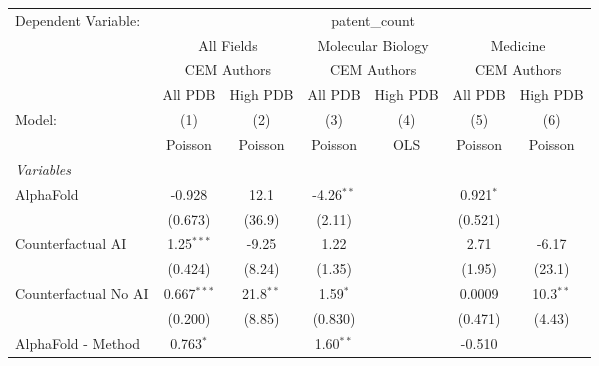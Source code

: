\begingroup
\centering
\begin{tabular}{lcccccc}
   \tabularnewline \midrule \midrule
   Dependent Variable: & \multicolumn{6}{c}{patent\_count}\\
 & \multicolumn{2}{c}{All Fields} & \multicolumn{2}{c}{Molecular Biology} & \multicolumn{2}{c}{Medicine} \\
\cmidrule(lr){2-3} \cmidrule(lr){4-5} \cmidrule(lr){6-7}
 & \multicolumn{2}{c}{CEM Authors} & \multicolumn{2}{c}{CEM Authors} & \multicolumn{2}{c}{CEM Authors} \\
\cmidrule(lr){2-3} \cmidrule(lr){4-5} \cmidrule(lr){6-7}
 & \multicolumn{1}{c}{All PDB} & \multicolumn{1}{c}{High PDB} & \multicolumn{1}{c}{All PDB} & \multicolumn{1}{c}{High PDB} & \multicolumn{1}{c}{All PDB} & \multicolumn{1}{c}{High PDB} \\
\cmidrule(lr){2-2} \cmidrule(lr){3-3} \cmidrule(lr){4-4} \cmidrule(lr){5-5} \cmidrule(lr){6-6} \cmidrule(lr){7-7}
   Model:                                                     & (1)           & (2)         & (3)           & (4)  & (5)           & (6)\\  
                                                              &  Poisson      & Poisson     & Poisson       & OLS  & Poisson       & Poisson\\  
   \midrule
   \emph{Variables}\\
   AlphaFold                                                  & -0.928        & 12.1        & -4.26$^{**}$  &      & 0.921$^{*}$   &   \\   
                                                              & (0.673)       & (36.9)      & (2.11)        &      & (0.521)       &   \\   
   Counterfactual AI                                          & 1.25$^{***}$  & -9.25       & 1.22          &      & 2.71          & -6.17\\   
                                                              & (0.424)       & (8.24)      & (1.35)        &      & (1.95)        & (23.1)\\   
   Counterfactual No AI                                       & 0.667$^{***}$ & 21.8$^{**}$ & 1.59$^{*}$    &      & 0.0009        & 10.3$^{**}$\\   
                                                              & (0.200)       & (8.85)      & (0.830)       &      & (0.471)       & (4.43)\\   
   AlphaFold - Method                                         & 0.763$^{*}$   &             & 1.60$^{**}$   &      & -0.510        &   \\   

\end{tabular}
